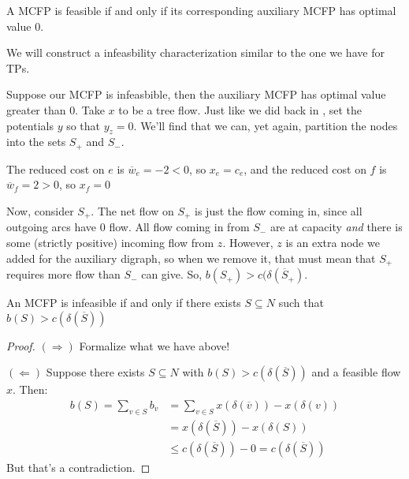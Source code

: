 \begin{theorem}{}{}
    A MCFP is feasible if and only if its corresponding auxiliary MCFP has optimal value $0$.
\end{theorem}

We will construct a infeasbility characterization similar to the one we have for TPs.

Suppose our MCFP is infeasbible, then the auxiliary MCFP has optimal value greater than $0$.
Take $x$ to be a tree flow.
Just like we did back in , set the potentials $y$ so that $y_z = 0$. We'll find that we can, yet again, partition the nodes into the sets $S_+$ and $S_-$. 

The reduced cost on $e$ is $\overline{w}_e = -2 < 0$, so $x_e = c_e$, and the reduced cost on $f$ is $\overline{w}_f = 2 > 0$, so $x_f = 0$

\begin{minipage}{\textwidth}
    \centering
\end{minipage}

Now, consider $S_+$.
The net flow on $S_+$ is just the flow coming in, since all outgoing arcs have $0$ flow.
All flow coming in from $S_-$ are at capacity \textit{and} there is some (strictly positive) incoming flow from $z$.
However, $z$ is an extra node we added for the auxiliary digraph, so when we remove it, that must mean that $S_+$ requires more flow than $S_-$ can give. 
So, $b(S_+) > c(\delta(\overline{S}_+)$.

\begin{theorem}{}{}
    An MCFP is infeasible if and only if there exists $S \subseteq N$ such that $b(S) > c(\delta(\overline{S}))$
\end{theorem}
\begin{proof}
    $(\Rightarrow)$ Formalize what we have above!

    $(\Leftarrow)$ Suppose there exists $S \subseteq N$ with $b(S) > c(\delta(\overline{S}))$ and a feasible flow $x$. Then:
    \begin{align*}
        b(S) = \sum_{v \in S} b_v &= \sum_{v \in S} x(\delta(\overline{v})) - x(\delta(v)) \\
        &= x(\delta(\overline{S})) - x(\delta(S)) \\ 
        &\leq c(\delta(\overline{S})) - 0 = c(\delta(\overline{S}))
    \end{align*}
    But that's a contradiction.
\end{proof}


